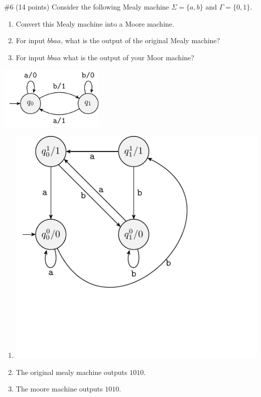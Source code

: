 \begin{problem}{\#6 (14 points)}
    Consider the following Mealy machine \(\Sigma = \{a,b\}\) and \(\Gamma = \{0,1\}\).
    \begin{enumerate}[label={\bf \alph*)}]
        \item Convert this Mealy machine into a Moore machine.
        \item For input \(bbaa\), what is the output of the original Mealy machine?
        \item For input \(bbaa\) what is the output of your Moor machine?
    \end{enumerate}
\end{problem}
\begin{center}
    \includegraphics[width=5cm]{figures/question/Question6.pdf}
\end{center}
\vspace{2em}
\begin{solution}
    \begin{enumerate}[label={\bf \alph*)}]
        \item \includegraphics[]{figures/answer/Answer6A.pdf}
        \item The original mealy machine outputs \(1010\).
        \item The moore machine outputs \(1010\).
    \end{enumerate}
\end{solution}